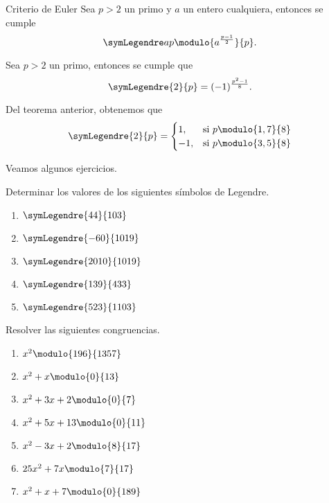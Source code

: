 \documentclass[12pt]{article}
\begin{document}
   \begin{theorem.box}{Criterio de Euler}{}
      Sea $p > 2$ un primo y $a$ un entero cualquiera, entonces se cumple
      \[
         \symLegendre a p \modulo{a^{\frac{p - 1}{2}}}{p}.
      \]
   \end{theorem.box}

   \begin{theorem.box}{}{}
      Sea $p > 2$ un primo, entonces se cumple que
      \[
         \symLegendre{2}{p} = (-1)^{\frac{p^2 - 1}{8}}.
      \]
   \end{theorem.box}

   \begin{remark.box}{}{}
      Del teorema anterior, obtenemos que
      \[
         \symLegendre{2}{p} =
         \begin{cases}
            1, &\text{si}\ p \modulo{1,7}{8}\\
            -1, &\text{si}\ p \modulo{3,5}{8}
         \end{cases}
      \]
   \end{remark.box}

   Veamos algunos ejercicios.
   \begin{exercise}
      Determinar los valores de los siguientes símbolos de Legendre.
      \begin{multicols}{3}
         \begin{enumerate}
            \item $\symLegendre{44}{103}$
            \item $\symLegendre{-60}{1019}$
            \item $\symLegendre{2010}{1019}$
            \item $\symLegendre{139}{433}$
            \item $\symLegendre{523}{1103}$
         \end{enumerate}
      \end{multicols}
   \end{exercise}

   \begin{exercise}
      Resolver las siguientes congruencias.
      \begin{multicols}{2}
         \begin{enumerate}
            \item $x^2 \modulo{196}{1357}$
            \item $x^2 + x \modulo{0}{13}$
            \item $x^2 + 3x + 2 \modulo{0}{7}$
            \item $x^2 + 5x + 13 \modulo{0}{11}$
            \item $x^2 - 3x + 2 \modulo{8}{17}$
            \item $25x^2 + 7x \modulo{7}{17}$
            \item $x^2 + x + 7 \modulo{0}{189}$
         \end{enumerate}
      \end{multicols}
   \end{exercise}
\end{document}
